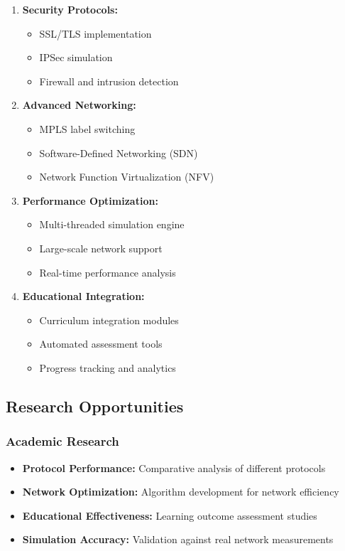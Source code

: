 \documentclass[12pt,a4paper]{article}
\begin{document}
\begin{enumerate}
\item \textbf{Security Protocols:}
   \begin{itemize}
   \item SSL/TLS implementation
   \item IPSec simulation
   \item Firewall and intrusion detection
   \end{itemize}

\item \textbf{Advanced Networking:}
   \begin{itemize}
   \item MPLS label switching
   \item Software-Defined Networking (SDN)
   \item Network Function Virtualization (NFV)
   \end{itemize}

\item \textbf{Performance Optimization:}
   \begin{itemize}
   \item Multi-threaded simulation engine
   \item Large-scale network support
   \item Real-time performance analysis
   \end{itemize}

\item \textbf{Educational Integration:}
   \begin{itemize}
   \item Curriculum integration modules
   \item Automated assessment tools
   \item Progress tracking and analytics
   \end{itemize}
\end{enumerate}

\subsection{Research Opportunities}

\subsubsection{Academic Research}

\begin{itemize}
\item \textbf{Protocol Performance:} Comparative analysis of different protocols
\item \textbf{Network Optimization:} Algorithm development for network efficiency
\item \textbf{Educational Effectiveness:} Learning outcome assessment studies
\item \textbf{Simulation Accuracy:} Validation against real network measurements
\end{itemize}
\end{document}
